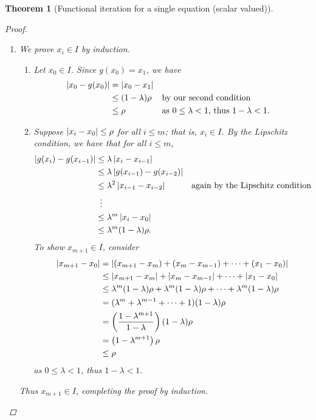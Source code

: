 \documentclass[12pt,letterpaper,DIV=11]{scrartcl}
\theoremstyle{plain}
\newtheorem{theorem}{Theorem}[section]
\theoremstyle{definition}
\theoremstyle{remark}
\begin{document}
\begin{theorem}[Functional iteration for a single equation (scalar valued)]
  \begin{proof}\leavevmode
    \begin{enumerate}
      \item We prove $x_i \in I$ by induction.
        \begin{enumerate}
          \item Let $x_0 \in I$.
            Since $g(x_0) = x_1$, we have \begin{align*}
              \left\lvert x_0 - g(x_0)\right\rvert &= \left\lvert x_0 - x_1\right\rvert \\
                                 &\leq (1 - \lambda) \rho && \text{by our second condition} \\
                                 &\leq \rho && \text{as $0 \leq \lambda < 1$, thus $1 - \lambda < 1$.}
            \end{align*}
          \item Suppose $\left\lvert x_i - x_0\right\rvert \leq \rho$ for all $i \leq m$; that is, $x_i \in I$.
            By the Lipschitz condition, we have that for all $i \leq m$, \begin{align*}
              \abs{g(x_i) - g(x_{i - 1})} &\leq \lambda \abs{x_i - x_{i - 1}} \\
                                          &\leq \lambda \abs{g(x_{i - 1}) - g(x_{i - 2})} \\
                                          &\leq \lambda^2 \abs{x_{i - 1} - x_{i - 2}} && \text{again by the Lipschitz condition} \\
                                          &\vdotswithin{\leq} \\
                                          &\leq \lambda^m \abs{x_i - x_0} \\
                                          &\leq \lambda^m (1 - \lambda) \rho.
            \end{align*}
            To show $x_{m + 1} \in I$, consider \begin{align*}
              \left\lvert x_{m + 1} - x_0\right\rvert &= \left\lvert(x_{m + 1} - x_m) + (x_m - x_{m - 1}) + \cdots + (x_1 - x_0)\right\rvert \\
                                    &\leq \left\lvert x_{m + 1} - x_m\right\rvert + \left\lvert x_m - x_{m - 1}\right\rvert + \cdots + \left\lvert x_1 - x_0\right\rvert \\
                                    &\leq \lambda^m (1 - \lambda) \rho + \lambda^m (1 - \lambda) \rho + \cdots + \lambda^m (1 - \lambda) \rho \\
                                    &= (\lambda^m + \lambda^{m - 1} + \cdots + 1) (1 - \lambda) \rho \\
                                    &= \left( \frac{1 - \lambda^{m + 1}}{1 - \lambda} \right) (1 - \lambda) \rho \\
                                    &= \left( 1 - \lambda^{m + 1} \right) \rho \\
                                    &\leq \rho
            \end{align*} as $0 \leq \lambda < 1$, thus $1 - \lambda < 1$.
        \end{enumerate}
        Thus $x_{m + 1} \in I$, completing the proof by induction.


\end{enumerate}
\end{proof}
\end{theorem}
\end{document}
